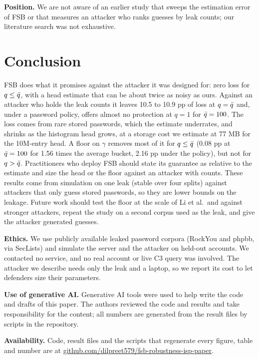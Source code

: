 \textbf{Position.} We are not aware of an earlier study that sweeps the estimation error of FSB or that measures an attacker who ranks guesses by leak counts; our literature search was not exhaustive.

\section{Conclusion}\label{sec:concl}

FSB does what it promises against the attacker it was designed for: zero loss for $q\le\bar q$, with a head estimate that can be about twice as noisy as ours. Against an attacker who holds the leak counts it leaves 10.5 to 10.9 pp of loss at $q=\bar q$ and, under a password policy, offers almost no protection at $q=1$ for $\bar q=100$. The loss comes from rare stored passwords, which the estimate underrates, and shrinks as the histogram head grows, at a storage cost we estimate at 77 MB for the 10M-entry head. A floor on $\gamma$ removes most of it for $q\le\bar q$ (0.08 pp at $\bar q=100$ for 1.56 times the average bucket, 2.16 pp under the policy), but not for $q>\bar q$. Practitioners who deploy FSB should state its guarantee as relative to the estimate and size the head or the floor against an attacker with counts. These results come from simulation on one leak (stable over four splits) against attackers that only guess stored passwords, so they are lower bounds on the leakage. Future work should test the floor at the scale of Li et al.\ and against stronger attackers, repeat the study on a second corpus used as the leak, and give the attacker generated guesses.

\textbf{Ethics.} We use publicly available leaked password corpora (RockYou and phpbb, via SecLists) and simulate the server and the attacker on held-out accounts. We contacted no service, and no real account or live C3 query was involved. The attacker we describe needs only the leak and a laptop, so we report its cost to let defenders size their parameters.

\textbf{Use of generative AI.} Generative AI tools were used to help write the code and drafts of this paper. The authors reviewed the code and results and take responsibility for the content; all numbers are generated from the result files by scripts in the repository.

\textbf{Availability.} Code, result files and the scripts that regenerate every figure, table and number are at \url{github.com/dilpreet579/fsb-robustness-isp-paper}.

